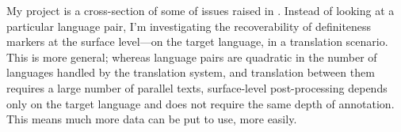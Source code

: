 \documentclass[11pt]{article}
\begin{document}
My project is a cross-section of some of issues raised in \citet{siegel:1996}. Instead of looking at a particular language pair, I'm investigating the recoverability of definiteness markers at the surface level---on the target language, in a translation scenario. This is more general; whereas language pairs are quadratic in the number of languages handled by the translation system, and translation between them requires a large number of parallel texts, surface-level post-processing depends only on the target language and does not require the same depth of annotation. This means much more data can be put to use, more easily.




\end{document}
